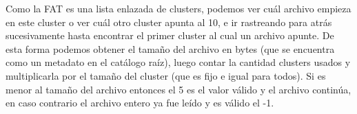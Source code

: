 \documentclass[11pt]{article}
\begin{document}
Como la FAT es una lista enlazada de clusters, podemos ver cuál archivo empieza 
en este cluster o ver cuál otro cluster apunta al 10, e ir rastreando para atrás
sucesivamente hasta encontrar el primer cluster al cual un archivo apunte. De 
esta forma podemos obtener el tamaño del archivo en bytes (que se encuentra como
un metadato en el catálogo raíz), luego contar
la cantidad clusters usados y multiplicarla por el tamaño del cluster (que es
fijo e igual para todos). Si es menor al tamaño del archivo entonces
el 5 es el valor válido y el archivo continúa, en caso contrario el archivo entero
ya fue leído y es válido el -1. 
\end{document}

